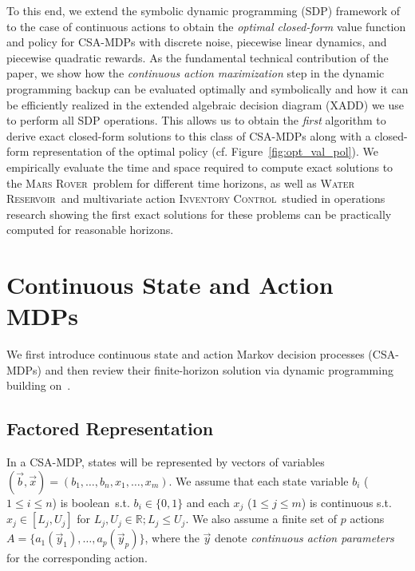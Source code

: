 \documentclass[letterpaper]{article}
\newcommand{\MarsRover}{\textsc{Mars Rover}}
\newcommand{\InventoryControl}{\textsc{Inventory Control}}
\newcommand{\WaterReservoir}{\textsc{Water Reservoir}}
\begin{document}
To this end, we extend the symbolic dynamic programming (SDP) framework
of~\cite{sanner_uai11} to the case of continuous actions to obtain the
\emph{optimal closed-form} value function and policy for CSA-MDPs with
discrete noise, piecewise linear dynamics, and piecewise quadratic
rewards.  As the fundamental technical contribution of the paper, we
show how the \emph{continuous action maximization} step in the dynamic
programming backup can be evaluated optimally and symbolically and how
it can be efficiently realized in the extended algebraic decision diagram (XADD)
we use to perform all SDP operations.  This
allows us to obtain the \emph{first} algorithm to derive exact closed-form
solutions to this class of CSA-MDPs along with a closed-form
representation of the optimal policy
(cf. Figure~\ref{fig:opt_val_pol}).  
We empirically evaluate the time and space required to compute exact
solutions to the \MarsRover\ problem for different time horizons, as
well as \WaterReservoir\ and multivariate action \InventoryControl\
studied in operations research showing the first exact solutions for
these problems can be practically computed for reasonable horizons.

\section{Continuous State and Action MDPs}

\label{sec:dcmdps}

We first introduce continuous state and action Markov decision
processes (CSA-MDPs) and then review their finite-horizon solution via
dynamic programming building on~\cite{sanner_uai11}.  

\subsection{Factored Representation}

In a CSA-MDP, states will be represented by vectors of variables
$(\vec{b},\vec{x}) = ( b_1,\ldots,b_n,x_{1},\ldots,x_m )$.  We assume
that each state variable $b_i$ ($1 \leq i \leq n$) is
boolean$\,$ s.t. $b_i \in \{ 0,1 \}$ and each $x_j$ ($1 \leq j \leq m$) is 
continuous s.t. $x_j \in [L_j,U_j]$ for $L_j,U_j \in
\mathbb{R}; L_j \leq U_j$.  We also assume a finite set of $p$ actions $A
= \{ a_1(\vec{y}_1), \ldots, a_p(\vec{y}_p) \}$, where the $\vec{y}$ denote
\emph{continuous action parameters} for the corresponding action.
\end{document}
